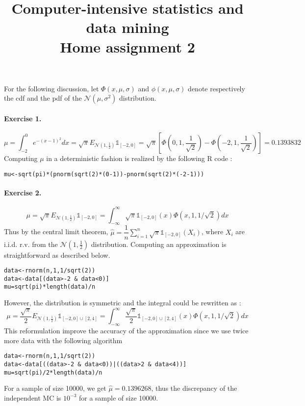 \documentclass{article}
\author{\and Susanne Bornelöv \and Thibault Latrille \and Yiming Zhang}
\title{Computer-intensive statistics and data mining
 \\ Home assignment 2}
\begin{document}
\maketitle
For the following discussion, let $\Phi(x,\mu,\sigma)$  and $\phi(x,\mu,\sigma)$ denote respectively the cdf and the pdf of the $\mathcal{N}(\mu,\sigma^2)$ distribution.

\paragraph{Exercise 1.}
$$ \mu=\int_{-2}^0 e^{-(x-1)^2}dx=\sqrt{\pi}E_{\mathcal{N}(1,\frac{1}{2})}\mathds{1}_{[-2,0]}=\sqrt{\pi} \left[ \Phi (0,1,\frac{1}{\sqrt{2}}) - \Phi(-2,1,\frac{1}{\sqrt{2}}) \right] =0.1393832$$
Computing $\mu$ in a deterministic fashion is realized by the following R code :
\begin{verbatim}
mu<-sqrt(pi)*(pnorm(sqrt(2)*(0-1))-pnorm(sqrt(2)*(-2-1)))
\end{verbatim}
\paragraph{Exercise 2.}

$$\displaystyle \mu=\sqrt{\pi}E_{\mathcal{N}(1,\frac{1}{2})}\mathds{1}_{[-2,0]}=\int_{-\infty}^{\infty} \sqrt{\pi} \mathds{1}_{[-2,0]}(x) \Phi (x,1,1 / \sqrt{2}) dx$$ Thus by the central limit theorem, $\displaystyle \widehat{\mu}=\dfrac{1}{n}\sum_{i=1}^n \sqrt{\pi} \mathds{1}_{[-2,0]}(X_i)$, where $X_i$ are i.i.d. r.v. from the $\mathcal{N}(1,\frac{1}{2})$ distribution. Computing an approximation is straightforward as described below.
\begin{verbatim}
data<-rnorm(n,1,1/sqrt(2))
data<-data[(data>-2 & data<0)]
mu=sqrt(pi)*length(data)/n
\end{verbatim}
However, the distribution is symmetric and the integral could be rewritten as : $$\displaystyle \mu=\frac{\sqrt{\pi}}{2}E_{\mathcal{N}(1,\frac{1}{2})}\mathds{1}_{[-2,0]\cup [2,4]}=\int_{-\infty}^{\infty} \dfrac{\sqrt{\pi}}{2} \mathds{1}_{[-2,0]\cup [2,4]}(x) \Phi (x,1,1 / \sqrt{2}) dx$$
This reformulation improve the accuracy of the approximation since we use twice more data with the following algorithm
\begin{verbatim}
data<-rnorm(n,1,1/sqrt(2))
data<-data[((data>-2 & data<0))|((data>2 & data<4))]
mu=sqrt(pi)/2*length(data)/n
\end{verbatim}
For a sample of size 10000, we get $\widehat{\mu}=0.1396268$, thus the discrepancy of the independent MC is $10^{-3}$ for a sample of size 10000.
\end{document}
